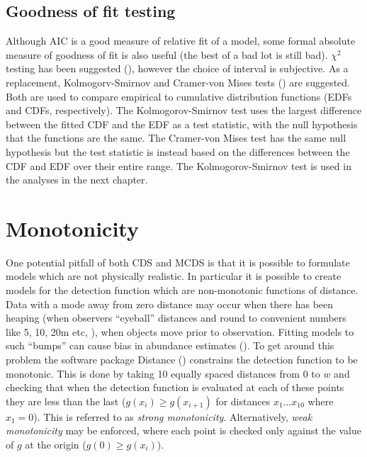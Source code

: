\subsection{Goodness of fit testing}
Although AIC is a good measure of relative fit of a model, some formal absolute measure of goodness of fit is also useful (the best of a bad lot is still bad). $\chi^2$ testing has been suggested (\cite[pp. 69-71]{IDS}), however the choice of interval is subjective. As a replacement, Kolmogorv-Smirnov and Cramer-von Mises tests (\cite[pp. 385-389]{ADS}) are suggested. Both are used to compare empirical to cumulative distribution functions (EDFs and CDFs, respectively). The Kolmogorov-Smirnov test uses the largest difference between the fitted CDF and the EDF as a test statistic, with the null hypothesis that the functions are the same. The Cramer-von Mises test has the same null hypothesis but the test statistic is instead based on the differences between the CDF and EDF over their entire range. The Kolmogorov-Smirnov test is used in the analyses in the next chapter.

\section{Monotonicity}
\label{intro-ds-mono}
One potential pitfall of both CDS and MCDS is that  it is possible to formulate models which are not physically realistic. In particular it is possible to create models for the detection function which are non-monotonic functions of distance. Data with a mode away from zero distance may occur when there has been heaping (when observers ``eyeball'' distances and round to convenient numbers like 5, 10, 20m etc, \cite[pp. 34-35]{IDS}), when objects move prior to observation. Fitting models to such ``bumps'' can cause bias in abundance estimates (\cite[p. 132]{IDS}). To get around this problem the software package Distance (\cite{distance-software})\label{cor-7s14-2} constrains the detection function to be monotonic. This is done by taking 10 equally spaced distances from $0$ to $w$ and checking that when the detection function is evaluated at each of these points they are less than the last ($g(x_i)\geq g(x_{i+1})$ for distances $x_1 \dots x_{10}$ where $x_1=0$). This is referred to as \textit{strong monotonicity}. Alternatively, \textit{weak monotonicity} may be enforced, where each point is checked only against the value of $g$ at the origin ($g(0)\geq g(x_i)$).

